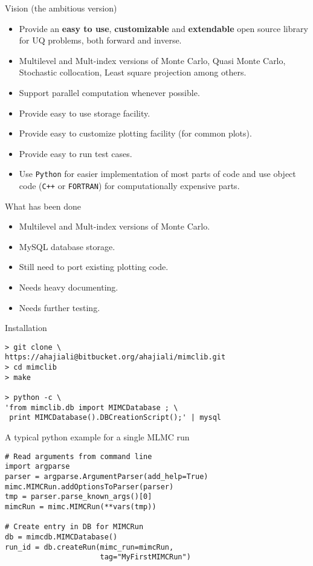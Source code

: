 {
\nofooter \noheader \frame[noframenumbering]{\titlepage}
}

\begin{frame}{Vision (the ambitious version)}
  \begin{itemize}
  \item Provide an \textbf{easy to use}, \textbf{customizable} and
    \textbf{extendable} open source library for UQ problems, both
    forward and inverse.
  \item Multilevel and Mult-index versions of Monte Carlo, Quasi Monte
    Carlo, Stochastic collocation, Least square projection among
    others.
  \item Support parallel computation whenever possible.
  \item Provide easy to use storage facility.
  \item Provide easy to customize plotting facility (for common
    plots).
  \item Provide easy to run test cases.
  \item Use \texttt{Python} for easier implementation of most parts of code
    and use object code (\texttt{C++} or \texttt{FORTRAN}) for
    computationally expensive parts.
  \end{itemize}
\end{frame}

\begin{frame}{What has been done}
  \begin{itemize}
  \item Multilevel and Mult-index versions of Monte Carlo.
  \item MySQL database storage.
  \item Still need to port existing plotting code.
  \item Needs heavy documenting.
  \item Needs further testing.
  \end{itemize}
\end{frame}

\begin{frame}[fragile]{Installation}
\begin{verbatim}
> git clone \
https://ahajiali@bitbucket.org/ahajiali/mimclib.git
> cd mimclib
> make

> python -c \
'from mimclib.db import MIMCDatabase ; \
 print MIMCDatabase().DBCreationScript();' | mysql
\end{verbatim}
\end{frame}

\begin{frame}[fragile]{A typical python example for a single MLMC run}
\begin{verbatim}
# Read arguments from command line
import argparse
parser = argparse.ArgumentParser(add_help=True)
mimc.MIMCRun.addOptionsToParser(parser)
tmp = parser.parse_known_args()[0]
mimcRun = mimc.MIMCRun(**vars(tmp))

# Create entry in DB for MIMCRun
db = mimcdb.MIMCDatabase()
run_id = db.createRun(mimc_run=mimcRun,
                      tag="MyFirstMIMCRun")
\end{verbatim}
\end{frame}

